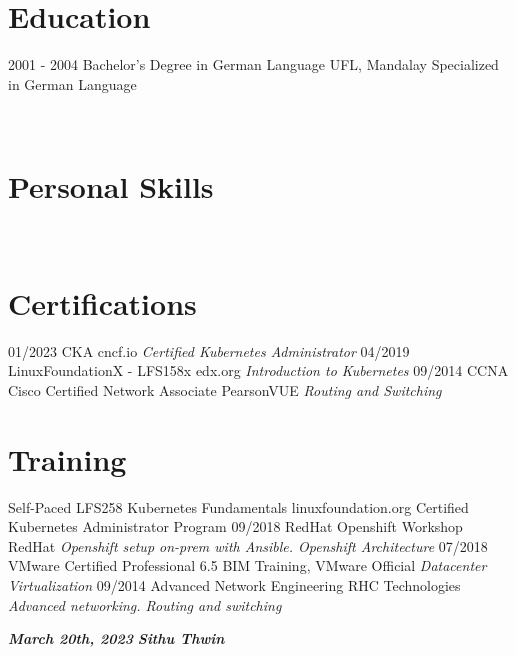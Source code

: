\documentclass[]{friggeri-cv}
\begin{document}
\section{Education}
\begin{entrylist}
  \entry
    {2001 - 2004}
    {Bachelor's Degree in German Language}
    {UFL, Mandalay}
    {Specialized in German Language\\ }
\end{entrylist}


\begin{aside}
~
~
~
~
  \section{Personal Skills}
~
\end{aside}
\section{Certifications}
\begin{entrylist}
  \entry
  {01/2023}
  {CKA}
  {cncf.io}
  {\emph{Certified Kubernetes Administrator}}
  \entry
  {04/2019}
  {LinuxFoundationX - LFS158x}
  {edx.org}
  {\emph{Introduction to Kubernetes}}
  \entry
  {09/2014}
  {CCNA Cisco Certified Network Associate}
  {PearsonVUE}
  {\emph{Routing and Switching}}
\end{entrylist}
\newpage
\section{Training}
\begin{entrylist}
  \entry
  {Self-Paced}
  {LFS258 Kubernetes Fundamentals}
  {linuxfoundation.org}
  {Certified Kubernetes Administrator Program}
  \entry
  {09/2018}
  {RedHat Openshift Workshop}
  {RedHat}
  {\emph{Openshift setup on-prem with Ansible. Openshift Architecture}}	\entry
  {07/2018}
  {VMware Certified Professional 6.5}
  {BIM Training, VMware Official}
  {\emph{Datacenter Virtualization}}
  \entry
  {09/2014}
  {Advanced Network Engineering}
  {RHC Technologies}
  {\emph{Advanced networking. Routing and switching}}
\end{entrylist}

\textbf{\emph{March 20th, 2023}}
\hfill
\textbf{\emph{Sithu Thwin}}
\end{document}
